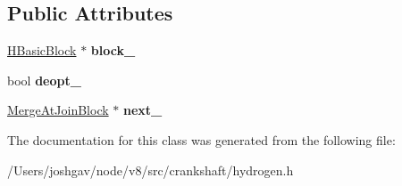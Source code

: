 \subsection*{Public Attributes}
\begin{DoxyCompactItemize}
\item 
\hyperlink{classv8_1_1internal_1_1_h_basic_block}{H\+Basic\+Block} $\ast$ {\bfseries block\+\_\+}\hypertarget{classv8_1_1internal_1_1_h_graph_builder_1_1_if_builder_1_1_merge_at_join_block_ab9d579a13472416d2d91a544b712c4c1}{}\label{classv8_1_1internal_1_1_h_graph_builder_1_1_if_builder_1_1_merge_at_join_block_ab9d579a13472416d2d91a544b712c4c1}

\item 
bool {\bfseries deopt\+\_\+}\hypertarget{classv8_1_1internal_1_1_h_graph_builder_1_1_if_builder_1_1_merge_at_join_block_a19b24710179a9576fceb44aecdce1ca5}{}\label{classv8_1_1internal_1_1_h_graph_builder_1_1_if_builder_1_1_merge_at_join_block_a19b24710179a9576fceb44aecdce1ca5}

\item 
\hyperlink{classv8_1_1internal_1_1_h_graph_builder_1_1_if_builder_1_1_merge_at_join_block}{Merge\+At\+Join\+Block} $\ast$ {\bfseries next\+\_\+}\hypertarget{classv8_1_1internal_1_1_h_graph_builder_1_1_if_builder_1_1_merge_at_join_block_accb298f0671c3cc4695a8389ac5127c0}{}\label{classv8_1_1internal_1_1_h_graph_builder_1_1_if_builder_1_1_merge_at_join_block_accb298f0671c3cc4695a8389ac5127c0}

\end{DoxyCompactItemize}


The documentation for this class was generated from the following file\+:\begin{DoxyCompactItemize}
\item 
/\+Users/joshgav/node/v8/src/crankshaft/hydrogen.\+h\end{DoxyCompactItemize}
